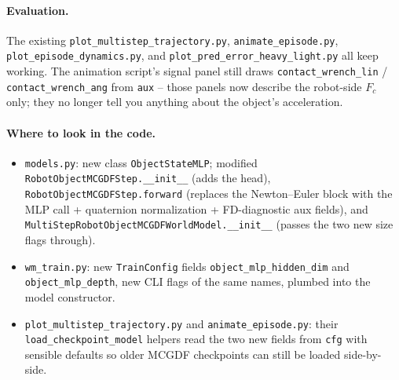 \documentclass[11pt]{article}
\begin{document}
\paragraph{Evaluation.}  The existing
\texttt{plot\_multistep\_trajectory.py},
\texttt{animate\_episode.py}, \texttt{plot\_episode\_dynamics.py},
and \texttt{plot\_pred\_error\_heavy\_light.py} all keep working.
The animation script's signal panel still draws
\texttt{contact\_wrench\_lin} / \texttt{contact\_wrench\_ang} from
\texttt{aux} -- those panels now describe the robot-side $F_c$ only;
they no longer tell you anything about the object's acceleration.

\paragraph{Where to look in the code.}
\begin{itemize}
  \item \texttt{models.py}: new class \texttt{ObjectStateMLP};
    modified \texttt{RobotObjectMCGDFStep.\_\_init\_\_} (adds the
    head), \texttt{RobotObjectMCGDFStep.forward} (replaces the
    Newton--Euler block with the MLP call + quaternion normalization
    + FD-diagnostic aux fields), and
    \texttt{MultiStepRobotObjectMCGDFWorldModel.\_\_init\_\_} (passes
    the two new size flags through).
  \item \texttt{wm\_train.py}: new \texttt{TrainConfig} fields
    \texttt{object\_mlp\_hidden\_dim} and \texttt{object\_mlp\_depth},
    new CLI flags of the same names, plumbed into the model
    constructor.
  \item \texttt{plot\_multistep\_trajectory.py} and
    \texttt{animate\_episode.py}: their \texttt{load\_checkpoint\_model}
    helpers read the two new fields from \texttt{cfg} with sensible
    defaults so older MCGDF checkpoints can still be loaded
    side-by-side.
\end{itemize}
\end{document}
